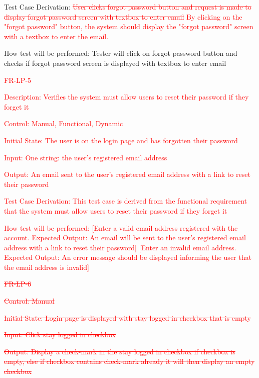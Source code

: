 \documentclass[12pt, titlepage]{article}
\begin{document}
\begin{enumerate}
	Test Case Derivation: \textcolor{red}{\sout{User clicks forgot password button and request is made to display forgot password screen with textbox to enter email}} \textcolor{red}{By clicking on the "forgot password" button, the system should display the "forgot password" screen with a textbox to enter the email.}
	
	How test will be performed: Tester will click on forgot password button and checks if forgot password screen is displayed with textbox to enter email

         \textcolor{red}{\item{FR-LP-5\\}}

        \textcolor{red}{Description: Verifies the system must allow users to reset their password if they forget it}
	
	\textcolor{red}{Control: Manual, Functional, Dynamic}
	
	\textcolor{red}{Initial State: The user is on the login page and has forgotten their password}
	
	\textcolor{red}{Input: One string: the user's registered email address}
	
	\textcolor{red}{Output: An email sent to the user's registered email address with a link to reset their password}
	
	\textcolor{red}{Test Case Derivation: This test case is derived from the functional requirement that the system must allow users to reset their password if they forget it}
	
	\textcolor{red}{How test will be performed: [Enter a valid email address registered with the account. Expected Output: An email will be sent to the user's registered email address with a link to reset their password] [Enter an invalid email address. Expected Output: An error message should be displayed informing the user that the email address is invalid]}
	
\item{\textcolor{red}{\sout{FR-LP-6}}\\}

\textcolor{red}{\sout{Control: Manual}}

\textcolor{red}{\sout{Initial State: Login page is displayed with stay logged in checkbox that is empty}}

\textcolor{red}{\sout{Input: Click stay logged in checkbox}}

\textcolor{red}{\sout{Output: Display a check-mark in the stay logged in checkbox if checkbox is empty, else if checkbox contains check-mark already it will then display an empty checkbox}}


\end{enumerate}
\end{document}
